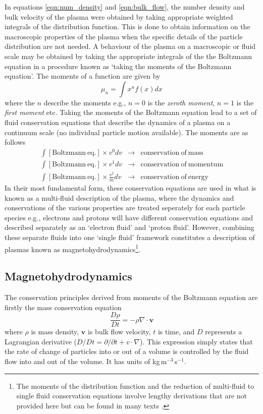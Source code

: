 In equations \ref{eqn:num_density} and \ref{eqn:bulk_flow}, the number density and bulk velocity of the plasma were obtained by taking appropriate weighted integrals of the distribution function. This is done to obtain information on the macroscopic properties of the plasma when the specific details of the particle distribution are not needed. A behaviour of the plasma on a macroscopic or fluid scale may be obtained by taking the appropriate integrals of the the Boltzmann equation in a procedure known as `taking the moments of the Boltzmann equation'. The moments of a function are given by 
\begin{equation}
\mu_n = \int x^n f(x) dx
\end{equation}
where the $n$ describe the moments e.g., $n=0$ is the {\it zeroth moment},  $n=1$ is the {\it first moment} etc. Taking the moments of the Boltzmann equation lead to a set of fluid conservation equations that describe the dynamics of a plasma on a continuum scale (no individual particle motion available). The moments are as follows
\begin{eqnarray*}
\int [\mathrm{Boltzmann~ eq.}]\times v^0 dv &\rightarrow& \mathrm{conservation~of~mass} \\
\int [\mathrm{Boltzmann~eq.}]\times v^1 dv &\rightarrow& \mathrm{conservation~of~momentum} \\
\int [\mathrm{Boltzmann~eq.}]\times \frac{v^2}{m} dv &\rightarrow& \mathrm{conservation~of~energy}
\end{eqnarray*}
In their most fundamental form, these conservation equations are used in what is known as a multi-fluid description of the plasma, where the dynamics and conservations of the various properties are treated seperately for each particle species e.g., electrons and protons will have different conservation equations and described separately as an \textquoteleft electron fluid' and \textquoteleft proton fluid'. However, combining these separate fluids into one \textquoteleft single fluid' framework constitutes a description of plasmas known as magnetohydrodynamics\footnote{The moments of the distribution function and the reduction of multi-fluid to single fluid conservation equations involve lengthy derivations that are not provided here but can be found in many texts \citep{goossens2003, inan2011}.}.

\subsection{Magnetohydrodynamics}\label{sec:12}
The conservation principles  derived from moments of the Boltzmann equation are firstly the mass conservation equation
\begin{equation}
\frac{D\rho}{Dt} = -\rho\nabla\cdot \mathbf{v}
\end{equation}
where $\rho$ is mass density, $\mathbf{v}$ is bulk flow velocity, $t$ is time, and $D$ represents a Lagrangian derivative ($D/Dt = \partial /\partial t + v\cdot \nabla$). This expression simply states that the rate of change of particles into or out of a volume is controlled by the fluid flow into and out of the volume. It has units of kg\,m$^{-3}$\,s$^{-1}$.

